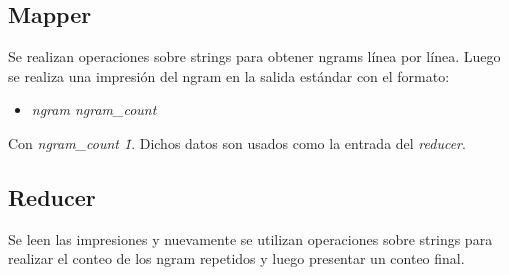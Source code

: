 \documentclass{article}
\begin{document}
\subsection{Mapper}
Se realizan operaciones sobre strings para obtener ngrams l\'inea por l\'inea. Luego se realiza una impresi\'on del ngram en la salida est\'andar con el formato:
\begin{itemize}
  \item \emph{ngram ngram\_count}
\end{itemize}
Con \emph{ngram\_count \= 1}. Dichos datos son usados como la entrada del \emph{reducer}.
\subsection{Reducer}
Se leen las impresiones y nuevamente se utilizan operaciones sobre strings para realizar el conteo de los ngram repetidos y luego presentar un conteo final.
\end{document}

